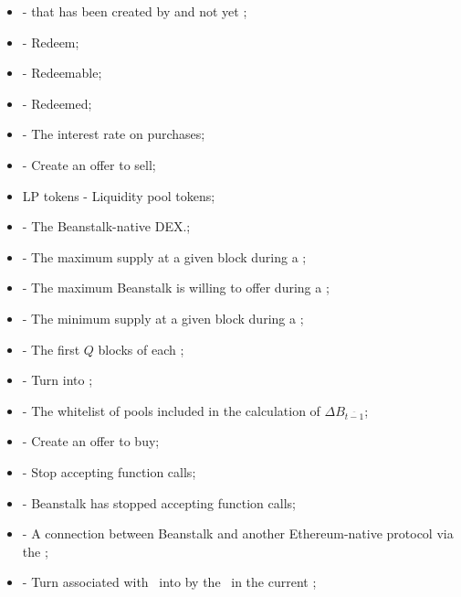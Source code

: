 \documentclass[class=article, crop=false]{standalone}
\begin{document}
\begin{itemize}[topsep=0pt, itemsep=3pt,leftmargin=16pt]
    \item[]  - \hypertarget{ht103}{ that has been created by  and not yet };
    \item[]  - \hypertarget{ht112}{Redeem};
    \item[]  - \hypertarget{ht113}{Redeemable};
    \item[]  - \hypertarget{ht114}{Redeemed};
    \item[]  - \hypertarget{ht115}{The interest rate on  purchases};
    \item[]  - \hypertarget{ht124}{Create an offer to sell};
    \item[] LP tokens - \hypertarget{ht125}{Liquidity pool tokens};
    \item[]  - \hypertarget{ht130}{The Beanstalk-native DEX.};
    \item[]  - The maximum  supply at a given block during a ;
    \item[]  - The maximum  Beanstalk is willing to offer during a ;
    \item[]  - The minimum  supply at a given block during a ;
    \item[]  - The first $Q$ blocks of each ;
    \item[]  - \hypertarget{ht131}{Turn  into };
    \item[]  - \hypertarget{ht133}{The whitelist of pools included in the calculation of $\Delta B_{\overline{t-1}}$};
    \item[]  - \hypertarget{ht134}{Create an offer to buy};
    \item[]  - \hypertarget{ht144}{Stop accepting  function calls};
    \item[]  - \hypertarget{ht145}{Beanstalk has stopped accepting  function calls};
    \item[]  - \hypertarget{ht146}{A connection between Beanstalk and another Ethereum-native protocol via the };
    \item[]  - \hypertarget{ht147}{Turn  associated with  \Bean\ into  by  the  \Bean\ in the current };

\end{itemize}
\end{document}
